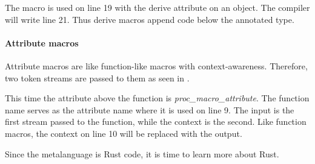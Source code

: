 The macro is used on line 19 with the derive attribute on an object.
The compiler will write line 21.
Thus derive macros append code below the annotated type.

\paragraph{Attribute macros}
Attribute macros are like function-like macros with context-awareness.
Therefore, two token streams are passed to them as seen in .


This time the attribute above the function is \textit{proc\_macro\_attribute}.
The function \colorbox{function}{name} serves as the attribute name where it is used on line 9.
The \colorbox{input}{input} is the first stream passed to the function, while the \colorbox{context}{context} is the second.
Like function macros, the \colorbox{context}{context} on line 10 will be replaced with the \colorbox{output}{output}.

Since the metalanguage is Rust code, it is time to learn more about Rust.


